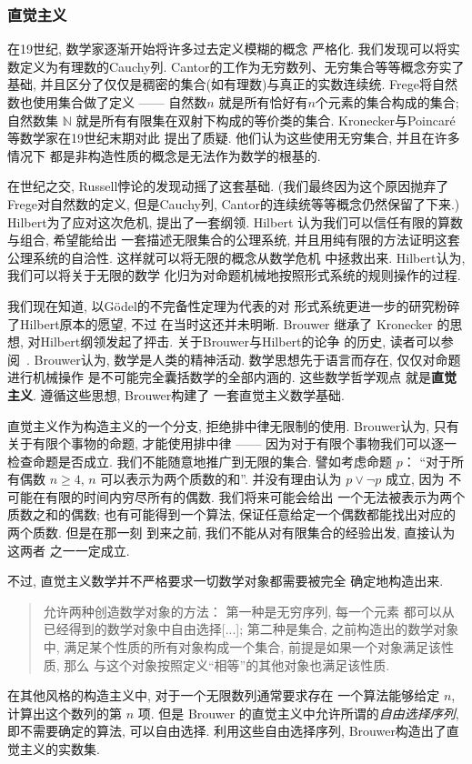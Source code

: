 \subsubsection{直觉主义}

在19世纪, 数学家逐渐开始将许多过去定义模糊的概念
严格化. 我们发现可以将实数定义为有理数的Cauchy列.
Cantor的工作为无穷数列、无穷集合等等概念夯实了基础,
并且区分了仅仅是稠密的集合(如有理数)与真正的实数连续统.
Frege将自然数也使用集合做了定义 ------ 自然数\(n\)
就是所有恰好有\(n\)个元素的集合构成的集合; 自然数集
\(\mathbb N\) 就是所有有限集在双射下构成的等价类的集合.
Kronecker与Poincar\'e等数学家在19世纪末期对此
提出了质疑. 他们认为这些使用无穷集合, 并且在许多情况下
都是非构造性质的概念是无法作为数学的根基的.

在世纪之交, Russell悖论的发现动摇了这套基础.
(我们最终因为这个原因抛弃了Frege对自然数的定义,
但是Cauchy列, Cantor的连续统等等概念仍然保留了下来.)
Hilbert为了应对这次危机, 提出了一套纲领. Hilbert
认为我们可以信任有限的算数与组合, 希望能给出
一套描述无限集合的公理系统, 并且用纯有限的方法证明这套
公理系统的自洽性. 这样就可以将无限的概念从数学危机
中拯救出来. Hilbert认为, 我们可以将关于无限的数学
化归为对命题机械地按照形式系统的规则操作的过程.

我们现在知道, 以G\"odel的不完备性定理为代表的对
形式系统更进一步的研究粉碎了Hilbert原本的愿望, 不过
在当时这还并未明晰. Brouwer 继承了 Kronecker 的思想,
对Hilbert纲领发起了抨击. 关于Brouwer与Hilbert的论争
的历史, 读者可以参阅~\cite{carl:1998:brouwer}.
Brouwer认为, 数学是人类的精神活动.
数学思想先于语言而存在, 仅仅对命题进行机械操作
是不可能完全囊括数学的全部内涵的. 这些数学哲学观点
就是\textbf{直觉主义}. 遵循这些思想, Brouwer构建了
一套直觉主义数学基础.

直觉主义作为构造主义的一个分支, 拒绝排中律无限制的使用.
Brouwer认为, 只有关于有限个事物的命题, 才能使用排中律
------ 因为对于有限个事物我们可以逐一检查命题是否成立.
我们不能随意地推广到无限的集合. 譬如考虑命题 \(p\)：
“对于所有偶数 \(n \ge 4\), \(n\) 可以表示为两个质数的和”.
并没有理由认为 \(p \vee \neg p\) 成立, 因为
不可能在有限的时间内穷尽所有的偶数. 我们将来可能会给出
一个无法被表示为两个质数之和的偶数; 也有可能得到一个算法,
保证任意给定一个偶数都能找出对应的两个质数. 但是在那一刻
到来之前, 我们不能从对有限集合的经验出发, 直接认为这两者
之一一定成立.

不过, 直觉主义数学并不严格要求一切数学对象都需要被完全
确定地构造出来.
\begin{quotation}
允许两种创造数学对象的方法： 第一种是无穷序列, 每一个元素
都可以从已经得到的数学对象中自由选择[...]; 第二种是集合,
之前构造出的数学对象中, 满足某个性质的所有对象构成一个集合,
前提是如果一个对象满足该性质, 那么
与这个对象按照定义“相等”的其他对象也满足该性质.~\cite{brouwer:1981:intuitionism}
\end{quotation}
在其他风格的构造主义中, 对于一个无限数列通常要求存在
一个算法能够给定 \(n\), 计算出这个数列的第 \(n\) 项.
但是 Brouwer 的直觉主义中允许所谓的\emph{自由选择序列},
即不需要确定的算法, 可以自由选择. 利用这些自由选择序列,
Brouwer构造出了直觉主义的实数集.

